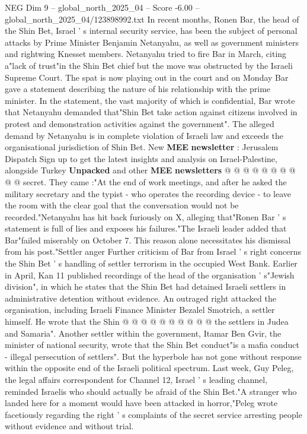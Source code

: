 \begin{textsample}{NEG Dim 9 – global\_north\_2025\_04 – Score -6.00 – global\_north\_2025\_04/123898992.txt}  \label{ex:f9_neg_034}
In recent months, Ronen Bar, the head of the Shin Bet, Israel ' s internal security service, has been the subject of personal attacks by Prime Minister Benjamin Netanyahu, as well as government ministers and rightwing Knesset members.
Netanyahu tried to fire Bar in March, citing a"lack of trust"in the Shin Bet chief but the move was obstructed by the Israeli Supreme Court.
The spat is now playing out in the court and on Monday Bar gave a statement describing the nature of his relationship with the prime minister.
In the statement, the vast majority of which is confidential, Bar wrote that Netanyahu demanded that"Shin Bet take action against citizens involved in protest and demonstration activities against the government".
The alleged demand by Netanyahu is in complete violation of Israeli law and exceeds the organisational jurisdiction of Shin Bet.
New \textbf{MEE} \textbf{newsletter} : Jerusalem Dispatch Sign up to get the latest insights and analysis on Israel-Palestine, alongside Turkey \textbf{Unpacked} and other \textbf{MEE} \textbf{newsletters} @ @ @ @ @ @ @ @ @ @ secret.
They came :"At the end of work meetings, and after he asked the military secretary and the typist - who operates the recording device - to leave the room with the clear goal that the conversation would not be recorded."Netanyahu has hit back furiously on X, alleging that"Ronen Bar ' s statement is full of lies and exposes his failures."The Israeli leader added that Bar"failed miserably on October 7.
This reason alone necessitates his dismissal from his post."Settler anger Further criticism of Bar from Israel ' s right concerns the Shin Bet ' s handling of settler terrorism in the occupied West Bank.
Earlier in April, Kan 11 published recordings of the head of the organisation ' s"Jewish division", in which he states that the Shin Bet had detained Israeli settlers in administrative detention without evidence.
An outraged right attacked the organisation, including Israeli Finance Minister Bezalel Smotrich, a settler himself.
He wrote that the Shin @ @ @ @ @ @ @ @ @ @ the settlers in Judea and Samaria".
Another settler within the government, Itamar Ben Gvir, the minister of national security, wrote that the Shin Bet conduct"is a mafia conduct - illegal persecution of settlers".
But the hyperbole has not gone without response within the opposite end of the Israeli political spectrum.
Last week, Guy Peleg, the legal affairs correspondent for Channel 12, Israel ' s leading channel, reminded Israelis who should actually be afraid of the Shin Bet."A stranger who landed here for a moment would have been attacked in horror,"Peleg wrote facetiously regarding the right ' s complaints of the secret service arresting people without evidence and without trial.

\end{textsample}
